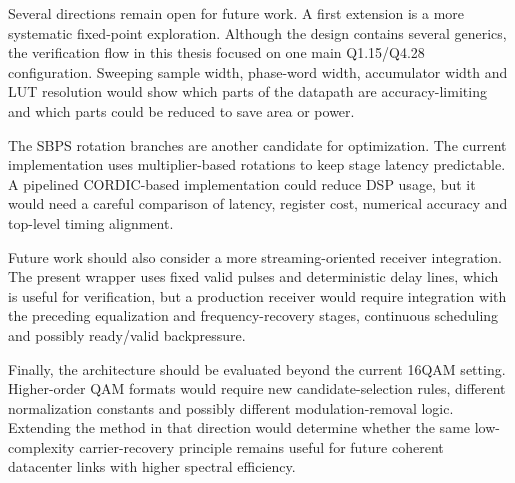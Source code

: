 Several directions remain open for future work. A first extension is a more systematic fixed-point exploration. Although the design contains several generics, the verification flow in this thesis focused on one main Q1.15/Q4.28 configuration. Sweeping sample width, phase-word width, accumulator width and \ac{LUT} resolution would show which parts of the datapath are accuracy-limiting and which parts could be reduced to save area or power.

The \ac{SBPS} rotation branches are another candidate for optimization. The current implementation uses multiplier-based rotations to keep stage latency predictable. A pipelined \ac{CORDIC}-based implementation could reduce DSP usage, but it would need a careful comparison of latency, register cost, numerical accuracy and top-level timing alignment.

Future work should also consider a more streaming-oriented receiver integration. The present wrapper uses fixed valid pulses and deterministic delay lines, which is useful for verification, but a production receiver would require integration with the preceding equalization and frequency-recovery stages, continuous scheduling and possibly ready/valid backpressure.

Finally, the architecture should be evaluated beyond the current \ac{16QAM} setting. Higher-order \ac{QAM} formats would require new candidate-selection rules, different normalization constants and possibly different modulation-removal logic. Extending the method in that direction would determine whether the same low-complexity carrier-recovery principle remains useful for future coherent datacenter links with higher spectral efficiency.
